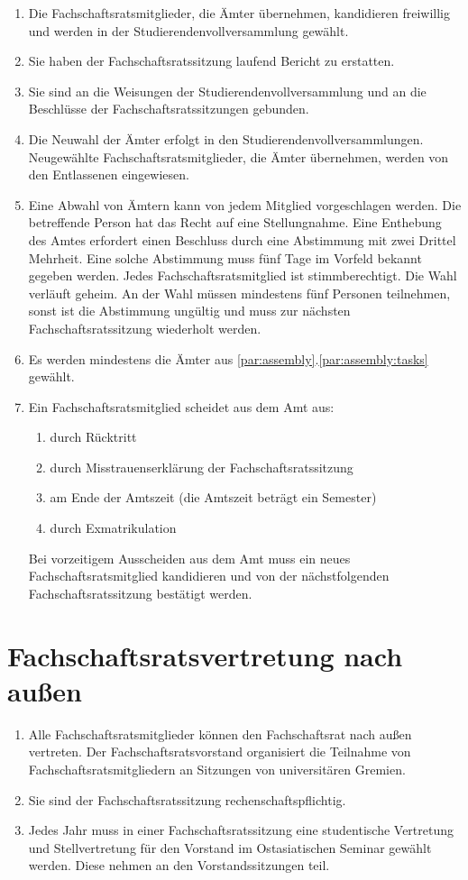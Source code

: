 \documentclass[12pt]{scrartcl}
\begin{document}
\begin{enumerate}
	\item Die Fachschaftsratsmitglieder, die Ämter übernehmen, kandidieren freiwillig und werden in der Studierendenvollversammlung gewählt.
	\item Sie haben der Fachschaftsratssitzung laufend Bericht zu erstatten.
	\item Sie sind an die Weisungen der Studierendenvollversammlung und an die Beschlüsse der Fachschaftsratssitzungen gebunden.
	\item Die Neuwahl der Ämter erfolgt in den Studierendenvollversammlungen. Neugewählte Fachschaftsratsmitglieder, die Ämter übernehmen, werden von den Entlassenen eingewiesen.
	\item Eine Abwahl von Ämtern kann von jedem Mitglied vorgeschlagen werden. Die betreffende Person hat das Recht auf eine Stellungnahme. Eine Enthebung des Amtes erfordert einen Beschluss durch eine Abstimmung mit zwei Drittel Mehrheit. Eine solche Abstimmung muss fünf Tage im Vorfeld bekannt gegeben werden. Jedes Fachschaftsratsmitglied ist stimmberechtigt. Die Wahl verläuft geheim. An der Wahl müssen mindestens fünf Personen teilnehmen, sonst ist die Abstimmung ungültig und muss zur nächsten Fachschaftsratssitzung wiederholt werden.
	\item Es werden mindestens die Ämter aus \ref{par:assembly}.\ref{par:assembly:tasks} gewählt.
	\item Ein Fachschaftsratsmitglied scheidet aus dem Amt aus:
	\begin{enumerate}
		\item durch Rücktritt
		\item durch Misstrauenserklärung der Fachschaftsratssitzung
		\item am Ende der Amtszeit (die Amtszeit beträgt ein Semester)
		\item durch Exmatrikulation
	\end{enumerate}
	Bei vorzeitigem Ausscheiden aus dem Amt muss ein neues Fachschaftsratsmitglied kandidieren und von der nächstfolgenden Fachschaftsratssitzung bestätigt werden.
\end{enumerate}

\section{Fachschaftsratsvertretung nach außen}

\begin{enumerate}
	\item Alle Fachschaftsratsmitglieder können den Fachschaftsrat nach außen vertreten. Der Fachschaftsratsvorstand organisiert die Teilnahme von Fachschaftsratsmitgliedern an Sitzungen von universitären Gremien.
	\item Sie sind der Fachschaftsratssitzung rechenschaftspflichtig.
	\item Jedes Jahr muss in einer Fachschaftsratssitzung eine studentische Vertretung und Stellvertretung für den Vorstand im Ostasiatischen Seminar gewählt werden. Diese nehmen an den Vorstandssitzungen teil. 
\end{enumerate}
\end{document}
